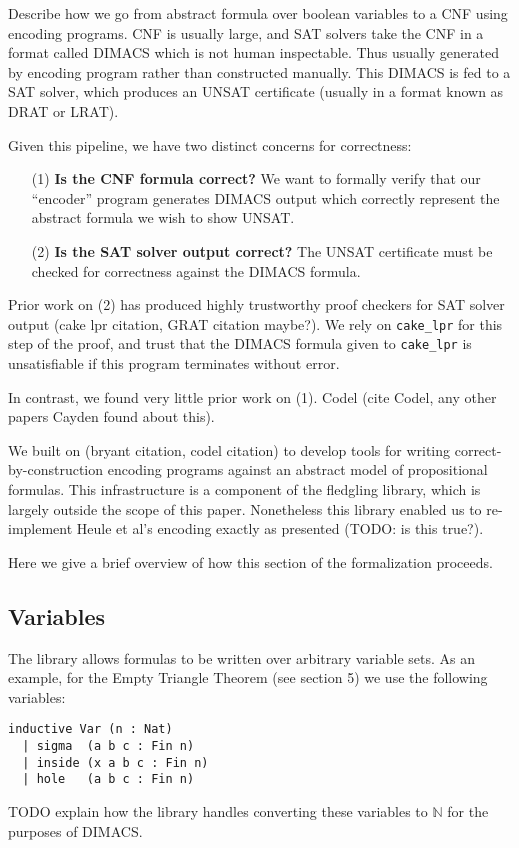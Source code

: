 Describe how we go from abstract formula over boolean variables
to a CNF using encoding programs.
CNF is usually large, and SAT solvers take the CNF in a format called DIMACS which is not human inspectable.
Thus usually generated by encoding program rather than constructed manually.
This DIMACS is fed to a SAT solver, which produces an UNSAT certificate
(usually in a format known as DRAT or LRAT).

Given this pipeline, we have two distinct concerns for correctness:
\begin{itemize}
    \item[(1)] \textbf{Is the CNF formula correct?}    
    We want to formally verify that our ``encoder'' program
    generates DIMACS output which
    correctly represent the abstract formula we wish to show UNSAT.
    \item[(2)] \textbf{Is the SAT solver output correct?}
    The UNSAT certificate must be checked for correctness
    against the DIMACS formula.
\end{itemize}

Prior work on (2) has produced highly trustworthy proof checkers
for SAT solver output (cake lpr citation, GRAT citation maybe?).
We rely on \texttt{cake\_lpr} for this step of the proof,
and trust that the DIMACS formula given to \texttt{cake\_lpr}
is unsatisfiable if this program terminates without error.

In contrast, we found very little prior work on (1).
Codel (cite Codel, any other papers Cayden found about this).

We built on (bryant citation, codel citation)
to develop tools for writing correct-by-construction encoding programs
against an abstract model of propositional formulas.
This infrastructure is a component of the fledgling \leansat{} library,
which is largely outside the scope of this paper.
Nonetheless this library enabled us to re-implement
Heule et al's encoding exactly as presented (TODO: is this true?).

Here we give a brief overview of how this section of the formalization proceeds.

\subsection{Variables}

The \leansat{} library allows formulas to be written over arbitrary variable sets.
As an example, for the Empty Triangle Theorem (see section 5) we use the following variables:
\begin{lstlisting}
inductive Var (n : Nat)
  | sigma  (a b c : Fin n)
  | inside (x a b c : Fin n)
  | hole   (a b c : Fin n)
\end{lstlisting}
TODO explain how the library handles converting these variables to \(\mathbb{N}\)
for the purposes of DIMACS.


